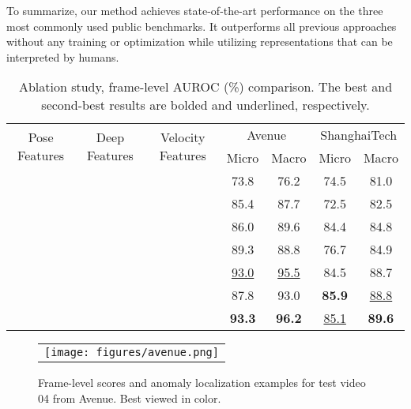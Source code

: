 \documentclass[10pt,twocolumn,letterpaper]{article}
\begin{document}
To summarize, our method achieves state-of-the-art performance on the three most commonly used public benchmarks. It outperforms all previous approaches without any training or optimization while utilizing representations that can be interpreted by humans.

\begin{table*}[t]
	\newcommand{\tabincell}[2]{\begin{tabular}{@{}#1@{}}#2\end{tabular}}
	\centering
	\begin{tabular}{| c | c | c | c | c | c | c |}
		\hline
	    \multirow{2}{*}{Pose Features} & \multirow{2}{*}{Deep Features} & \multirow{2}{*}{Velocity Features} & \multicolumn{2}{c|}{Avenue} & \multicolumn{2}{c|}{ShanghaiTech} \\ 
		\cline{4-7}
		& & & Micro & Macro & Micro & Macro \\
		\hline
		\checkmark & &  & 73.8 & 76.2 & 74.5 & 81.0 \\
		& \checkmark &  & 85.4 & 87.7 & 72.5 & 82.5 \\
		&  & \checkmark & 86.0 & 89.6 & 84.4 & 84.8 \\
		\hline
		\checkmark & \checkmark & & 89.3 & 88.8  & 76.7 & 84.9\\
		 & \checkmark & \checkmark  & \underline{93.0} & \underline{95.5} & 84.5 & 88.7 \\
		\checkmark &  & \checkmark & 87.8 & 93.0 & \textbf{85.9} & \underline{88.8} \\
		\hline
		\checkmark & \checkmark & \checkmark & \textbf{93.3} & \textbf{96.2} & \underline{85.1} & \textbf{89.6} \\
		\hline
\end{tabular}
	\caption{Ablation study, frame-level AUROC (\%) comparison. The best and second-best results are bolded and underlined, respectively.}
	\label{tab:ablation}
\end{table*}

\begin{figure}[t]
  \centering
    \begin{tabular}{c}
    \texttt{[image: figures/avenue.png]} 
    \end{tabular}
    \caption{Frame-level scores and anomaly localization examples for test video 04 from Avenue. Best viewed in color.}
    \label{fig:qualitative_avenue}
\end{figure}
\end{document}
